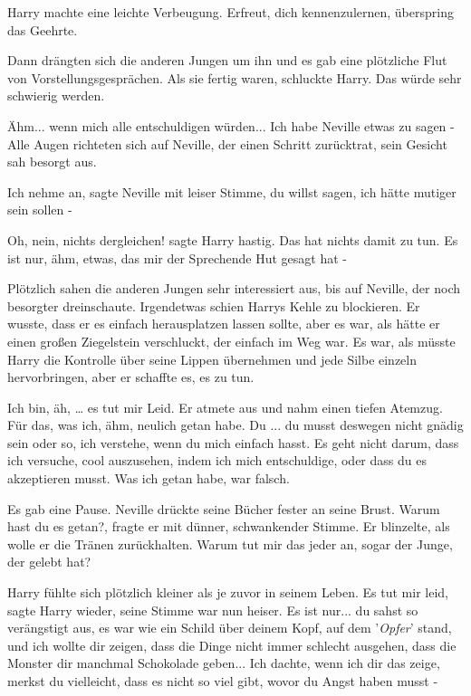 Harry machte eine leichte Verbeugung. \glqq Erfreut, dich kennenzulernen,
überspring das Geehrte.\grqq{}

Dann drängten sich die anderen Jungen um ihn und es gab eine plötzliche Flut von
Vorstellungsgesprächen. Als sie fertig waren, schluckte Harry. Das würde sehr
schwierig werden.

\glqq Ähm... wenn mich alle entschuldigen würden... Ich habe Neville etwas zu
sagen -\grqq{} Alle Augen richteten sich auf Neville, der einen Schritt
zurücktrat, sein Gesicht sah besorgt aus.

\glqq Ich nehme an\grqq{}, sagte Neville mit leiser Stimme, \glqq du willst
sagen, ich hätte mutiger sein sollen -\grqq{}

\glqq Oh, nein, nichts dergleichen!\grqq{} sagte Harry hastig. \glqq Das hat
nichts damit zu tun. Es ist nur, ähm, etwas, das mir der Sprechende Hut gesagt
hat -\grqq{}

Plötzlich sahen die anderen Jungen sehr interessiert aus, bis auf Neville, der
noch besorgter dreinschaute. Irgendetwas schien Harrys Kehle zu blockieren. Er
wusste, dass er es einfach herausplatzen lassen sollte, aber es war, als hätte
er einen großen Ziegelstein verschluckt, der einfach im Weg war. Es war, als
müsste Harry die Kontrolle über seine Lippen übernehmen und jede Silbe einzeln
hervorbringen, aber er schaffte es, es zu tun.

\glqq Ich bin, äh, … es tut mir Leid.\grqq{} Er atmete aus und nahm einen tiefen
Atemzug. \glqq Für das, was ich, ähm, neulich getan habe. Du ... du musst
deswegen nicht gnädig sein oder so, ich verstehe, wenn du mich einfach hasst. Es
geht nicht darum, dass ich versuche, cool auszusehen, indem ich mich
entschuldige, oder dass du es akzeptieren musst. Was ich getan habe, war
falsch.\grqq{}

Es gab eine Pause. Neville drückte seine Bücher fester an seine Brust. \glqq
Warum hast du es getan?\grqq{}, fragte er mit dünner, schwankender Stimme. Er
blinzelte, als wolle er die Tränen zurückhalten. \glqq Warum tut mir das jeder
an, sogar der Junge, der gelebt hat?\grqq{}

Harry fühlte sich plötzlich kleiner als je zuvor in seinem Leben. \glqq Es tut
mir leid\grqq{}, sagte Harry wieder, seine Stimme war nun heiser. \glqq Es ist
nur... du sahst so verängstigt aus, es war wie ein Schild über deinem Kopf, auf
dem '\emph{Opfer}' stand, und ich wollte dir zeigen, dass die Dinge nicht immer
schlecht ausgehen, dass die Monster dir manchmal Schokolade geben... Ich dachte,
wenn ich dir das zeige, merkst du vielleicht, dass es nicht so viel gibt, wovor
du Angst haben musst -\grqq{}

